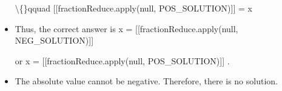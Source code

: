 \documentclass{article}
\begin{document}
\begin{itemize}
                            
                            \textbackslash\{\}qquad
                                [[fractionReduce.apply(null,
                                POS\_SOLUTION)]] = x
  \item Thus, the correct answer is
                        x =
                            [[fractionReduce.apply(null, NEG\_SOLUTION)]]
                        
                        or
                        x =
                            [[fractionReduce.apply(null, POS\_SOLUTION)]]
                        .
  \item The absolute value cannot be negative. Therefore, there
                        is no solution.
\end{itemize}
\end{document}
